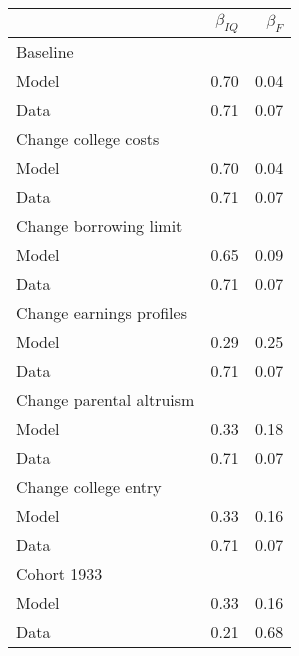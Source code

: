 \begin{tabular}{lrr}
\hline
  & $\beta_{IQ}$  & $\beta_{F}$  \\ 
\hline
Baseline &   &   \\ 
Model & 0.70  & 0.04  \\ 
Data & 0.71  & 0.07  \\ 
Change college costs &   &   \\ 
Model & 0.70  & 0.04  \\ 
Data & 0.71  & 0.07  \\ 
Change borrowing limit &   &   \\ 
Model & 0.65  & 0.09  \\ 
Data & 0.71  & 0.07  \\ 
Change earnings profiles &   &   \\ 
Model & 0.29  & 0.25  \\ 
Data & 0.71  & 0.07  \\ 
Change parental altruism &   &   \\ 
Model & 0.33  & 0.18  \\ 
Data & 0.71  & 0.07  \\ 
Change college entry &   &   \\ 
Model & 0.33  & 0.16  \\ 
Data & 0.71  & 0.07  \\ 
Cohort 1933 &   &   \\ 
Model & 0.33  & 0.16  \\ 
Data & 0.21  & 0.68  \\ 
\hline
\end{tabular}%
